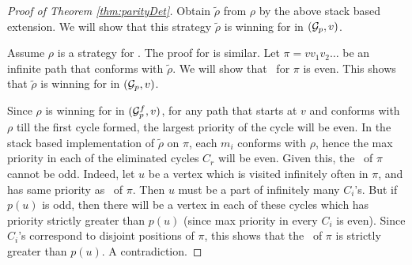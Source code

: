 \begin{proof}[Proof of Theorem \ref{thm:parityDet}]
    Obtain $\tilde{\rho}$ from $\rho$ by the above stack based extension. We will show that this strategy $ \tilde{\rho}$ is winning for  in $(\mathcal{G}_p,v)$.

    Assume $\rho$ is a strategy for . The proof for  is similar. Let $\pi = v v_1 v_2 \ldots $ be an infinite path that conforms with $\tilde{\rho}$. We will show that \mip\ for $\pi$ is even. This shows that $\tilde{\rho}$ is winning for  in $(\mathcal{G}_p,v)$.
    
    Since $\rho$ is winning for  in $(\mathcal{G}^f_p,v)$, for any path that starts at $v$ and conforms with $\rho$ till the first cycle formed, the largest priority of the cycle will be even. In the stack based implementation of $ \tilde{\rho}$ on $\pi$, each $m_i$ conforms with $\rho$, hence the max priority in each of the eliminated cycles $C_r$ will be even. Given this, the \mip\ of $\pi$ cannot be odd. Indeed, let $u$ be a vertex which is visited infinitely often in $\pi$, and has same priority as \mip\ of $\pi$. Then $u$ must be a part of infinitely many $C_i$'s. But if $p(u)$ is odd, then there will be a vertex in each of these cycles which has priority strictly greater than $p(u)$ (since max priority in every $C_i$ is even). Since $C_i$'s correspond to disjoint positions of $\pi$, this shows that the \mip\ of $\pi$ is strictly greater than $p(u)$. A contradiction.

\end{proof}

